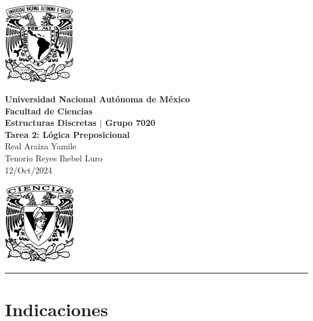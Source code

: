 \documentclass[11pt,letterpaper]{article}
\begin{document}

\begin{center}
    \begin{minipage}{3cm}
    	\begin{center}
    		\includegraphics[height=3.4cm]{./imagenes/logo_unam.png}
    	\end{center}
    \end{minipage}\hfill
    \begin{minipage}{10cm}
    	\begin{center}
    	\textbf{\large Universidad Nacional Autónoma de México}\\[0.1cm]
        \textbf{Facultad de Ciencias}\\[0.1cm]
        \textbf{Estructuras Discretas $|$ Grupo 7020}\\[0.1cm]
        \textbf{Tarea 2: Lógica Preposicional}\\[0.1cm]
        Real Araiza Yamile\\[0.1cm]
        Tenorio Reyes Ihebel Luro\\[0.1cm]
        12/Oct/2024
    	\end{center}
    \end{minipage}\hfill
    \begin{minipage}{3cm}
    	\begin{center}
    		\includegraphics[height=3.4cm]{./imagenes/Logo_FC.png}
    	\end{center}
    \end{minipage}
\end{center}

\rule{17cm}{0.1mm}


\section*{Indicaciones}
\end{document}
